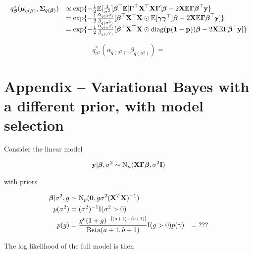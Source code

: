 \documentclass{amsart}[12pt]
\theoremstyle{definition}
\begin{document}
\begin{equation*}
	\begin{array}{rl}
		q^*_{\boldsymbol \beta}({\boldsymbol \mu}_{q({\boldsymbol \beta})}, {\boldsymbol \Sigma}_{q({\boldsymbol \beta})}) & \propto \exp \{ -\tfrac{1}{2} \mathbb{E} [\frac{1}{\sigma^2}] {\boldsymbol\beta}^\top \mathbb{E}[ {\boldsymbol \Gamma}^\top {\bf X}^\top {\bf X} {\boldsymbol\Gamma} ] {\boldsymbol\beta} - 2 {\bf X} \mathbb{E} {\boldsymbol \Gamma} {\boldsymbol \beta}^\top {\bf y} \}                           \\
		                                                  & = \exp\{ -\tfrac{1}{2} \frac{\alpha_{q(\sigma^2)}}{\beta_{q(\sigma^2)}} [{\boldsymbol \beta}^\top {\bf X}^\top {\bf X} \odot \mathbb{E}[{\boldsymbol \gamma} {\boldsymbol \gamma}^\top] {\boldsymbol\beta} - 2 {\bf X} \mathbb{E} {\boldsymbol \Gamma} {\boldsymbol \beta}^\top {\bf y}] \}   \\
		                                                  & = \exp\{ -\tfrac{1}{2} \frac{\alpha_{q(\sigma^2)}}{\beta_{q(\sigma^2)}} [{\boldsymbol \beta}^\top {\bf X}^\top {\bf X} \odot \text{diag}{({\bf p}({\bf1}- {\bf p}))} {\boldsymbol\beta} - 2 {\bf X} \mathbb{E} {\boldsymbol \Gamma} {\boldsymbol \beta}^\top {\bf y}] \} 
	\end{array}
\end{equation*}

\begin{equation*}
	q^*_{\sigma^2}(\alpha_{q(\sigma^2)}, \beta_{q(\sigma^2)}) = 
\end{equation*}

\section{Appendix -- Variational Bayes with a different prior, with model selection}

Consider the linear model

\begin{align*}
	{\bf y} | {\boldsymbol \beta}, \sigma^2 \sim \text{N}_n({\bf X} {\boldsymbol \Gamma} {\boldsymbol \beta}, \sigma^2 {\bf I}) 
\end{align*}

with priors

\begin{align*}
	{\boldsymbol\beta} | \sigma^2, g & \sim \text{N}_p({\bf 0}, g \sigma^2 ({\bf X}^T {\bf X})^{-1})                             \\
	p(\sigma^2)          & = (\sigma^2)^{-1} \text{I}(\sigma^2 > 0)                                         \\
	p(g)                 & = \frac{g^b (1 + g)^{-[(a + 1) + (b + 1)]}}{\text{Beta}(a + 1, b + 1)} \text{I}(g > 0) 
	p(\gamma)            & = \text{???}                                                               
\end{align*}

The log likelihood of the full model is then
\end{document}
